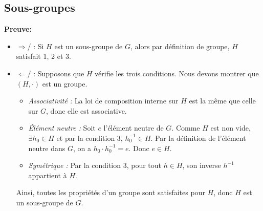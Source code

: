 \documentclass{article}
\begin{document}
\subsection{Sous-groupes}


\noindent\textbf{Preuve:}
\begin{itemize}
    \item \(\Rightarrow\)/ : Si \(H\) est un sous-groupe de \(G\), alors par définition de groupe, \(H\) satisfait 1, 2 et 3.
    \item \(\Leftarrow\)/ : Supposons que \(H\) vérifie les trois conditions. Nous devons montrer que \((H, \cdot)\) est un groupe.
    \begin{itemize}
        \item \textit{Associativité :} La loi de composition interne sur \(H\) est la même que celle sur \(G\), donc elle est associative.
        \item \textit{Élément neutre :} Soit \(e\) l'élément neutre de \(G\). Comme \(H\) est non vide, \(\exists h_0\in H\) et par la condition 3, \(h_0^{-1} \in H\). Par la définition de l'élément neutre dans \(G\), on a \(h_0 \cdot h_0^{-1} = e\). Donc \(e \in H\).
        \item \textit{Symétrique :} Par la condition 3, pour tout \(h \in H\), son inverse \(h^{-1}\) appartient à \(H\).
    \end{itemize}
    Ainsi, toutes les propriétés d'un groupe sont satisfaites pour \(H\), donc \(H\) est un sous-groupe de \(G\).   
\end{itemize}
\end{document}
